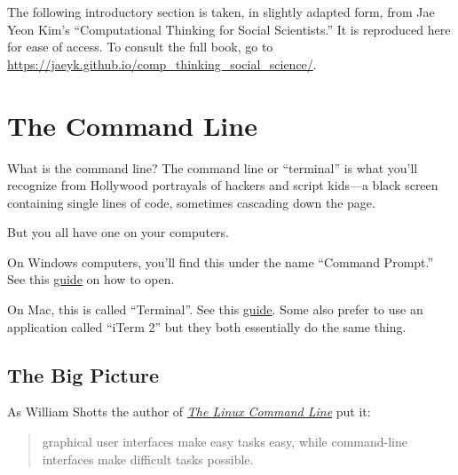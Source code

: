 \documentclass[
  letterpaper,
  DIV=11,
  numbers=noendperiod]{scrreprt}
\begin{document}
\begin{tcolorbox}[enhanced jigsaw, rightrule=.15mm, arc=.35mm, bottomrule=.15mm, colback=white, toprule=.15mm, breakable, left=2mm, colframe=quarto-callout-note-color-frame, leftrule=.75mm, opacityback=0]
\begin{minipage}[t]{5.5mm}
\textcolor{quarto-callout-note-color}{\faInfo}
\end{minipage}%
\begin{minipage}[t]{\textwidth - 5.5mm}
The following introductory section is taken, in slightly adapted form,
from Jae Yeon Kim's ``Computational Thinking for Social Scientists.'' It
is reproduced here for ease of access. To consult the full book, go to
\url{https://jaeyk.github.io/comp_thinking_social_science/}.\end{minipage}%
\end{tcolorbox}

\hypertarget{the-command-line}{%
\section*{The Command Line}\label{the-command-line}}

What is the command line? The command line or ``terminal'' is what
you'll recognize from Hollywood portrayals of hackers and script
kids---a black screen containing single lines of code, sometimes
cascading down the page.

But you all have one on your computers.

On Windows computers, you'll find this under the name ``Command
Prompt.'' See this
\href{https://www.wikihow.com/Open-Terminal-in-Windows}{guide} on how to
open.

On Mac, this is called ``Terminal''. See this
\href{https://www.wikihow.com/Open-a-Terminal-Window-in-Mac}{guide}.
Some also prefer to use an application called ``iTerm 2'' but they both
essentially do the same thing.

\hypertarget{the-big-picture}{%
\subsection*{The Big Picture}\label{the-big-picture}}

As William Shotts the author of
\href{http://linuxcommand.org/tlcl.php}{\emph{The Linux Command Line}}
put it:

\begin{quote}
graphical user interfaces make easy tasks easy, while command-line
interfaces make difficult tasks possible.
\end{quote}
\end{document}
